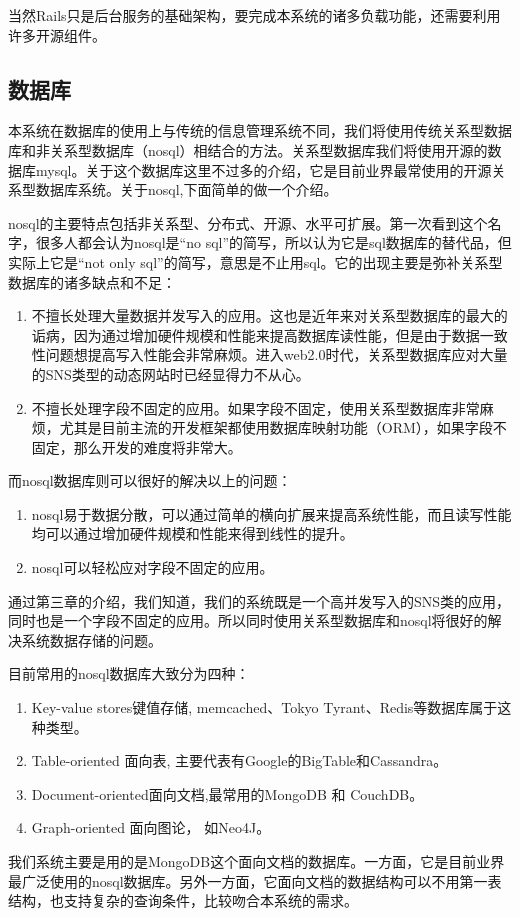 当然Rails只是后台服务的基础架构，要完成本系统的诸多负载功能，还需要利用许多开源组件。

\subsection{数据库}
\label{sec:database}

本系统在数据库的使用上与传统的信息管理系统不同，我们将使用传统关系型数据库和非关系型数据库（nosql）相结合的方法。关系型数据库我们将使用开源的数据库mysql。关于这个数据库这里不过多的介绍，它是目前业界最常使用的开源关系型数据库系统。关于nosql,下面简单的做一个介绍。

nosql的主要特点包括非关系型、分布式、开源、水平可扩展。第一次看到这个名字，很多人都会认为nosql是“no sql”的简写，所以认为它是sql数据库的替代品，但实际上它是“not only sql”的简写，意思是不止用sql。它的出现主要是弥补关系型数据库的诸多缺点和不足：
\begin{enumerate}
\item 不擅长处理大量数据并发写入的应用。这也是近年来对关系型数据库的最大的诟病，因为通过增加硬件规模和性能来提高数据库读性能，但是由于数据一致性问题想提高写入性能会非常麻烦。进入web2.0时代，关系型数据库应对大量的SNS类型的动态网站时已经显得力不从心。
\item 不擅长处理字段不固定的应用。如果字段不固定，使用关系型数据库非常麻烦，尤其是目前主流的开发框架都使用数据库映射功能（ORM），如果字段不固定，那么开发的难度将非常大。
\end{enumerate}
而nosql数据库则可以很好的解决以上的问题：
\begin{enumerate}
\item nosql易于数据分散，可以通过简单的横向扩展来提高系统性能，而且读写性能均可以通过增加硬件规模和性能来得到线性的提升。
\item nosql可以轻松应对字段不固定的应用。
\end{enumerate}
通过第三章的介绍，我们知道，我们的系统既是一个高并发写入的SNS类的应用，同时也是一个字段不固定的应用。所以同时使用关系型数据库和nosql将很好的解决系统数据存储的问题。


目前常用的nosql数据库大致分为四种：
\begin{enumerate}
\item Key-value stores键值存储, memcached、Tokyo Tyrant、Redis等数据库属于这种类型。
\item Table-oriented 面向表, 主要代表有Google的BigTable和Cassandra。
\item Document-oriented面向文档,最常用的MongoDB 和 CouchDB。
\item Graph-oriented 面向图论， 如Neo4J。
\end{enumerate}
我们系统主要是用的是MongoDB这个面向文档的数据库。一方面，它是目前业界最广泛使用的nosql数据库。另外一方面，它面向文档的数据结构可以不用第一表结构，也支持复杂的查询条件，比较吻合本系统的需求。
